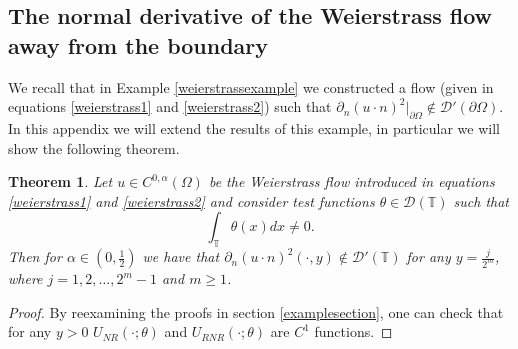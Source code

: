 \documentclass[12pt,a4paper]{article}
\newtheorem{theorem}{Theorem}[section]
\theoremstyle{definition}
\theoremstyle{remark}
\numberwithin{equation}{section}
\begin{document}
\begin{appendices}
\section{The normal derivative of the Weierstrass flow away from the boundary} \label{normalderivativeappendix}
We recall that in Example \ref{weierstrassexample} we constructed a flow (given in equations \eqref{weierstrass1} and \eqref{weierstrass2}) such that $\partial_n (u \cdot n)^2 \lvert_{\partial \Omega} \notin \mathcal{D}' (\partial \Omega)$. In this appendix we will extend the results of this example, in particular we will show the following theorem.
\begin{theorem}
Let $u \in C^{0,\alpha} (\Omega)$ be the Weierstrass flow introduced in equations \eqref{weierstrass1} and \eqref{weierstrass2} and consider test functions $\theta \in \mathcal{D} (\mathbb{T})$ such that
\begin{equation*}
\int_{\mathbb{T}} \theta(x) dx \not=0.
\end{equation*}
Then for $\alpha \in \left(0, \frac{1}{2} \right)$ we have that $\partial_n (u \cdot n)^2 (\cdot, y) \notin \mathcal{D}' (\mathbb{T})$ for any $y = \frac{j}{2^m}$, where $j = 1, 2, \ldots , 2^m - 1$ and $m \geq 1$. 
\end{theorem}
\begin{proof}
By reexamining the proofs in section \ref{examplesection}, one can check that for any $y > 0$ $U_{NR} (\cdot ; \theta)$ and $U_{RNR} (\cdot ; \theta)$ are $C^1 $ functions. 


\end{proof}
\end{appendices}
\end{document}
